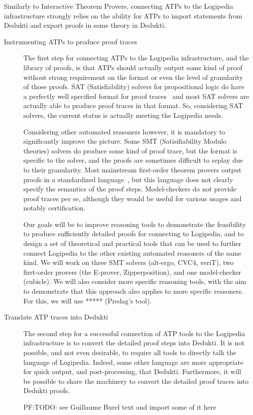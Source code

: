 Similarly to Interactive Theorem Provers, connecting ATPs to the Logipedia
infrastructure strongly relies on the ability for ATPs to import statements from
{\sf Dedukti} and export proofs in some theory in {\sf Dedukti}.

\begin{description}
\item[Instrumenting ATPs to produce proof traces] The first step for connecting ATPs to the Logipedia infrastructure, and the library of proofs, is that ATPs should actually output some kind of proof without strong requirement on the format or even the level of granularity of those proofs.  SAT (Satisfiability) solvers for propositional logic do have a perfectly well specified format for proof traces~\cite{TODO} and most SAT solvers are actually able to produce proof traces in that format.  So, considering SAT solvers, the current status is actually meeting the Logipedia needs.

  Considering other automated reasoners however, it is mandatory to significantly improve the picture.  Some SMT (Satisifiability Modulo theories) solvers do produce some kind of proof trace, but the format is specific to the solver, and the proofs are sometimes difficult to replay due to their granularity.  Most mainstream first-order theorem provers output proofs in a standardized language~\cite{}, but this language does not clearly specify the semantics of the proof steps.  Model-checkers do not provide proof traces per se, although they would be useful for various usages and notably certification.

  Our goals will be to improve reasoning tools to demonstrate the feasibility to produce sufficiently detailed proofs for connecting to Logipedia, and to design a set of theoretical and practical tools that can be used to further connect Logipedia to the other existing automated reasoners of the same kind.  We will work on three SMT solvers (alt-ergo, CVC4, veriT), two first-order provers (the E-prover, Zipperposition), and one model-checker (cubicle).  We will also consider more specific reasoning tools, with the aim to demonstrate that this approach also applies to more specific reasoners.  For this, we will use ***** (Predag's tool).

\item[Translate ATP traces into Dedukti] The second step for a successful
  connection of ATP tools to the Logipedia infrastructure is to convert the
  detailed proof steps into Dedukti.  It is not possible, and not even
  desirable, to require all tools to directly talk the language of Logipedia.
  Indeed, some other language are more appropriate for quick output, and
  post-processing, that Dedukti.  Furthermore, it will be possible to share the
  machinery to convert the detailed proof traces into Dedukti proofs.

  PF:TODO: see Guillaume Burel text and import some of it here
\end{description}

